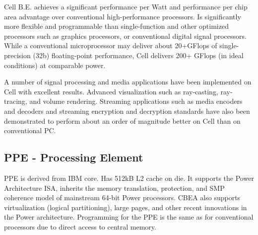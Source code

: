 Cell B.E. achieves a significant performance per Watt and performance per chip area advantage over conventional high-performance processors.
Is significantly more flexible and programmable than single-function and other optimized processors such as graphics processors, or conventional digital signal processors.
While a conventional microprocessor may deliver about 20+GFlops of single-precision (32b) floating-point performance, Cell delivers 200+ GFlops (in ideal conditions) at comparable power.

A number of signal processing and media applications have been implemented on Cell with excellent results.
Advanced visualization such as ray-casting, ray-tracing, and volume rendering.
Streaming applications such as media encoders and decoders and streaming encryption and decryption standards have also been demonstrated to perform about an order of magnitude better on Cell than on conventional PC.

\subsection{PPE -  Processing Element}
PPE is derived from IBM  core. Has 512kB L2 cache on die.
It supports the Power Architecture ISA, inherits the memory translation, protection, and SMP coherence model of mainstream 64-bit Power processors.
CBEA also supports virtualization (logical partitioning), large pages, and other recent innovations in the Power architecture.
Programming for the PPE is the same as for conventional processors due to direct access to central memory.

